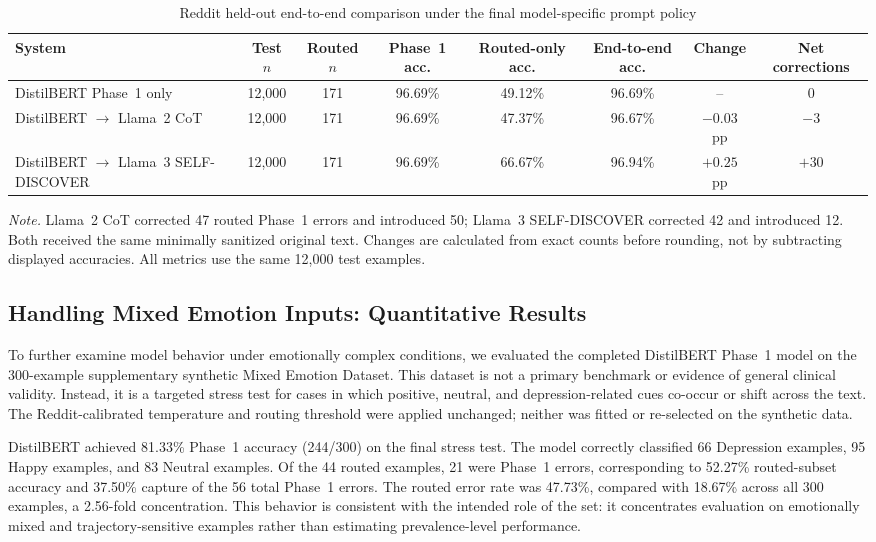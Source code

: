 \documentclass{ieeeaccess}
\begin{document}
\begin{table}[t]
\centering
\caption{Reddit held-out end-to-end comparison under the final model-specific prompt policy}
\label{tab:reddit-e2e-results}
\scriptsize
\setlength{\tabcolsep}{2.1pt}
\renewcommand{\arraystretch}{1.16}
\begin{tabularx}{\textwidth}{@{}>{\raggedright\arraybackslash}X c c c c c c c@{}}
\toprule
System & Test $n$ & Routed $n$ & Phase~1 acc. & Routed-only acc. & End-to-end acc. & Change & Net corrections \\
\midrule
DistilBERT Phase~1 only & 12,000 & 171 & 96.69\% & 49.12\% & 96.69\% & -- & 0 \\
DistilBERT $\rightarrow$ Llama~2 CoT & 12,000 & 171 & 96.69\% & 47.37\% & 96.67\% & $-0.03$ pp & $-3$ \\
DistilBERT $\rightarrow$ Llama~3 SELF-DISCOVER & 12,000 & 171 & 96.69\% & 66.67\% & 96.94\% & $+0.25$ pp & $+30$ \\
\bottomrule
\end{tabularx}
\vspace{2pt}
\parbox{\textwidth}{\footnotesize \textit{Note.} Llama~2 CoT corrected 47 routed Phase~1 errors and introduced 50; Llama~3 SELF-DISCOVER corrected 42 and introduced 12. Both received the same minimally sanitized original text. Changes are calculated from exact counts before rounding, not by subtracting displayed accuracies. All metrics use the same 12,000 test examples.}
\end{table}

\subsection{Handling Mixed Emotion Inputs: Quantitative Results}

To further examine model behavior under emotionally complex conditions, we evaluated the completed DistilBERT Phase~1 model on the 300-example supplementary synthetic Mixed Emotion Dataset. This dataset is not a primary benchmark or evidence of general clinical validity. Instead, it is a targeted stress test for cases in which positive, neutral, and depression-related cues co-occur or shift across the text. The Reddit-calibrated temperature and routing threshold were applied unchanged; neither was fitted or re-selected on the synthetic data.

DistilBERT achieved 81.33\% Phase~1 accuracy (244/300) on the final stress test. The model correctly classified 66 Depression examples, 95 Happy examples, and 83 Neutral examples. Of the 44 routed examples, 21 were Phase~1 errors, corresponding to 52.27\% routed-subset accuracy and 37.50\% capture of the 56 total Phase~1 errors. The routed error rate was 47.73\%, compared with 18.67\% across all 300 examples, a 2.56-fold concentration. This behavior is consistent with the intended role of the set: it concentrates evaluation on emotionally mixed and trajectory-sensitive examples rather than estimating prevalence-level performance.
\end{document}
